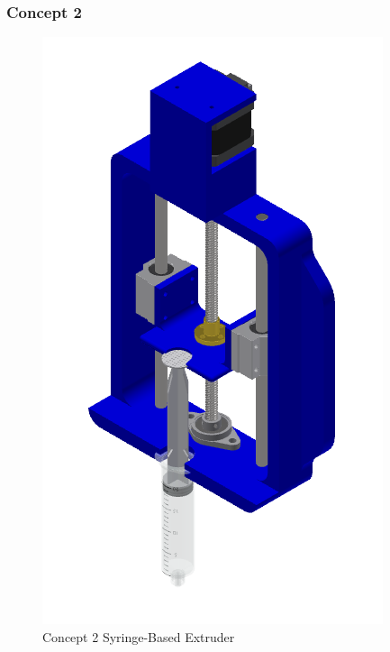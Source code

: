 \subsubsection*{Concept 2}
\begin{figure}[H]
    \centering
    \includegraphics[scale=1]{figs/SyringeConcept2.png}
    \caption{Concept 2 Syringe-Based Extruder}
    \label{fig:extruderConcept2}
\end{figure}
